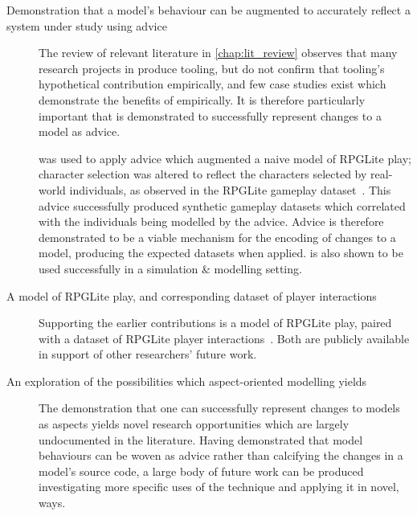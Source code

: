 \begin{description}
  \item[Demonstration that a model's behaviour can be augmented to accurately
    reflect a system under study using advice] The review of relevant literature
    in \cref{chap:lit_review} observes that many research projects in
    \aop{} produce tooling, but do not confirm that
    tooling's hypothetical contribution empirically, and few case studies exist
    which demonstrate the benefits of \aop{} empirically.
    It is therefore particularly important that \pdsf{} is demonstrated to
    successfully represent changes to a model as advice.

    \pdsf{} was used to apply advice which augmented a naive model of RPGLite
    play; character selection was altered to reflect the characters selected by
    real-world individuals, as observed in the RPGLite gameplay
    dataset~\cite{rpglite_dataset}. This advice successfully produced synthetic
    gameplay datasets which correlated with the individuals being modelled by
    the advice. Advice is therefore demonstrated to be a viable mechanism for
    the encoding of changes to a model, producing the expected datasets when
    applied. \pdsf{} is also shown to be used successfully in a simulation \&
    modelling setting.


  \item[A model of RPGLite play, and corresponding dataset of player
    interactions] Supporting the earlier contributions is a model of RPGLite
    play, paired with a dataset of RPGLite
    player interactions~\cite{rpglite_dataset}. Both are publicly available in
    support of other researchers' future work.

  \item[An exploration of the possibilities which aspect-oriented modelling
    yields] The demonstration that one can successfully represent changes to
    models as aspects yields novel research opportunities which are largely
    undocumented in the literature. Having demonstrated that model behaviours
    can be woven as advice rather than calcifying the changes in a model's
    source code, a large body of future work can be produced investigating more
    specific uses of the technique and applying it in novel, ways.
    

\end{description}
